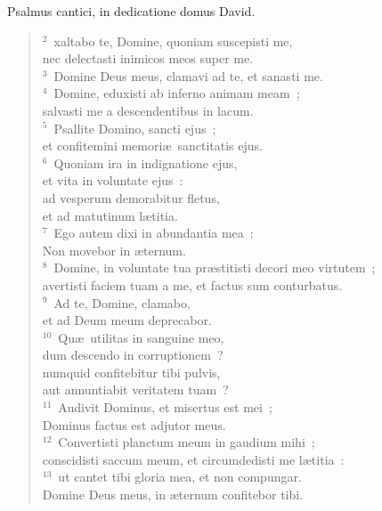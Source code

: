 \bchapter[Psalm]
Psalmus cantici, in dedicatione domus David.
\begin{verse}${}^{2}$~xaltabo te, Domine, quoniam suscepisti me,\\ nec delectasti inimicos meos super me.\\
${}^{3}$~Domine Deus meus, clamavi ad te, et sanasti me.\\
${}^{4}$~Domine, eduxisti ab inferno animam meam~;\\ salvasti me a descendentibus in lacum.\\
${}^{5}$~Psallite Domino, sancti ejus~;\\ et confitemini memori\ae\ sanctitatis ejus.\\
${}^{6}$~Quoniam ira in indignatione ejus,\\ et vita in voluntate ejus~:\\ ad vesperum demorabitur fletus,\\ et ad matutinum l\ae titia.\\
${}^{7}$~Ego autem dixi in abundantia mea~:\\ Non movebor in \ae ternum.\\
${}^{8}$~Domine, in voluntate tua pr\ae stitisti decori meo virtutem~;\\ avertisti faciem tuam a me, et factus sum conturbatus.\\
${}^{9}$~Ad te, Domine, clamabo,\\ et ad Deum meum deprecabor.\\
${}^{10}$~Qu\ae\ utilitas in sanguine meo,\\ dum descendo in corruptionem~?\\ numquid confitebitur tibi pulvis,\\ aut annuntiabit veritatem tuam~?\\
${}^{11}$~Audivit Dominus, et misertus est mei~;\\ Dominus factus est adjutor meus.\\
${}^{12}$~Convertisti planctum meum in gaudium mihi~;\\ conscidisti saccum meum, et circumdedisti me l\ae titia~:\\
${}^{13}$~ut cantet tibi gloria mea, et non compungar.\\ Domine Deus meus, in \ae ternum confitebor tibi.\end{verse}



